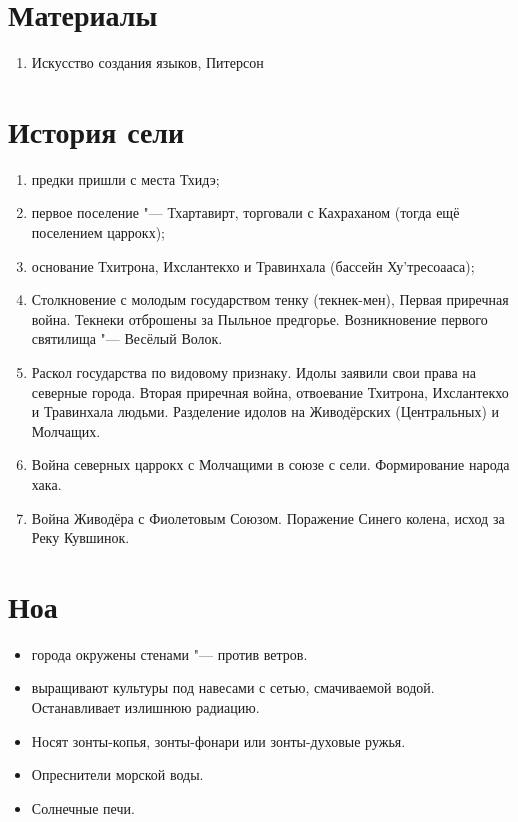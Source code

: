 \section{Материалы}

\begin{enumerate}

\item Искусство создания языков, Питерсон

\end{enumerate}

\section{История сели}

\begin{enumerate}
\item предки пришли с места Тхидэ;
\item первое поселение "--- Тхартавирт, торговали с Кахраханом (тогда ещё поселением царрокх);
\item основание Тхитрона, Ихслантекхо и Травинхала (бассейн Ху'тресоааса);
\item Столкновение с молодым государством тенку (текнек-мен), Первая приречная война.
Текнеки отброшены за Пыльное предгорье.
Возникновение первого святилища "--- Весёлый Волок.
\item Раскол государства по видовому признаку.
Идолы заявили свои права на северные города.
Вторая приречная война, отвоевание Тхитрона, Ихслантекхо и Травинхала людьми.
Разделение идолов на Живодёрских (Центральных) и Молчащих.
\item Война северных царрокх с Молчащими в союзе с сели.
Формирование народа хака.
\item Война Живодёра с Фиолетовым Союзом.
Поражение Синего колена, исход за Реку Кувшинок.
\end{enumerate}

\section{Ноа}

\begin{itemize}
\item города окружены стенами "--- против ветров.
\item выращивают культуры под навесами с сетью, смачиваемой водой.
Останавливает излишнюю радиацию.
\item Носят зонты-копья, зонты-фонари или зонты-духовые ружья.
\item Опреснители морской воды.
\item Солнечные печи.
\end{itemize}

